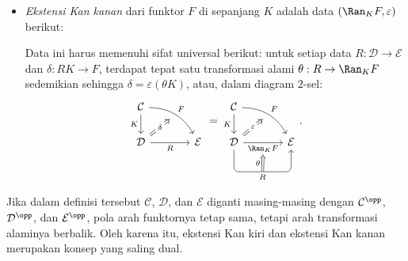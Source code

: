 \begin{definisi}[D.\ Kan]
\begin{itemize}
		\item \emph{Ekstensi Kan kanan} dari funktor $F$ di sepanjang $K$ adalah
		data $(\Ran_K F, \varepsilon)$ berikut:
		Data ini harus memenuhi sifat universal berikut: untuk setiap data
		$R: \mathcal{D} \to \mathcal{E}$ dan $\delta: RK \to F$, terdapat tepat
		satu transformasi alami $\theta: R \to \Ran_K F$ sedemikian sehingga
		$\delta = \varepsilon (\theta K)$, atau, dalam diagram $2$-sel:
		\[\begin{tikzcd}[column sep=large]
			\mathcal{C} \arrow[d, "K"'] \arrow[rd, bend left, "F", ""' {name=F}] & \\
			\mathcal{D} \arrow[r, "R"'] \arrow[Rightarrow, to=F, "\delta" description] & \mathcal{E}
		\end{tikzcd} = \begin{tikzcd}[column sep=large]
			\mathcal{C} \arrow[d, "K"'] \arrow[rd, bend left, "F", ""' {name=F}] & \\
			\mathcal{D} \arrow[r, "{\Ran_K F}"' name=A] \arrow[Rightarrow, to=F, "\varepsilon" description] \arrow[r, "R"{below, name=B}, rounded corners, to path={-- ([yshift=-2em]\tikztostart.south) -- ([yshift=-2em] \tikztotarget.south) [midway]\tikztonodes -- (\tikztotarget) }] & \mathcal{E} \arrow[Rightarrow, from=B, to=A, "\theta"]
		\end{tikzcd}. \]
	\end{itemize}
\end{definisi}

Jika dalam definisi tersebut $\mathcal{C}$, $\mathcal{D}$, dan $\mathcal{E}$
diganti masing-masing dengan $\mathcal{C}^{\opp}$, $\mathcal{D}^{\opp}$, dan
$\mathcal{E}^{\opp}$, pola arah funktornya tetap sama, tetapi arah transformasi
alaminya berbalik. Oleh karena itu, ekstensi Kan kiri dan ekstensi Kan kanan
merupakan konsep yang saling dual.

